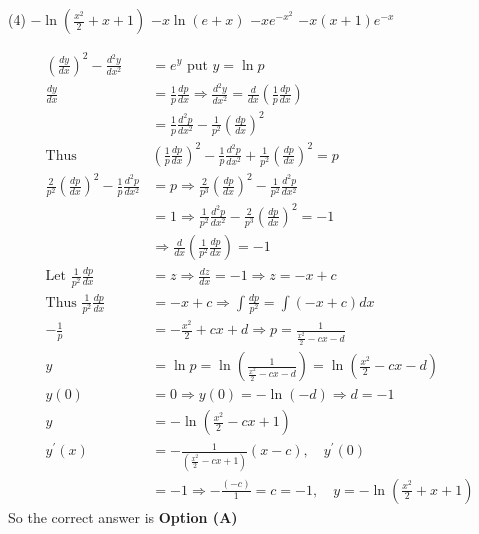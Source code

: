 \begin{enumerate}[label=\color{ocre}\textbf{\arabic*.}]
	{}
	\begin{tasks}(4)
		\task[\textbf{A.}] $-\ln \left(\frac{x^{2}}{2}+x+1\right)$
		\task[\textbf{B.}] $-x \ln (e+x)$
		\task[\textbf{C.}] $-x e^{-x^{2}}$
		\task[\textbf{D.}]  $-x(x+1) e^{-x}$
	\end{tasks}
	\begin{answer}
		\begin{align*}
		\left(\frac{d y}{d x}\right)^{2}-\frac{d^{2} y}{d x^{2}}&=e^{y}\text{ put }y=\ln p\\
		\frac{d y}{d x}&=\frac{1}{p} \frac{d p}{d x} \Rightarrow \frac{d^{2} y}{d x^{2}}=\frac{d}{d x}\left(\frac{1}{p} \frac{d p}{d x}\right)\\&=\frac{1}{p} \frac{d^{2} p}{d x^{2}}-\frac{1}{p^{2}}\left(\frac{d p}{d x}\right)^{2}\\
		\text{Thus }&\left(\frac{1}{p} \frac{d p}{d x}\right)^{2}-\frac{1}{p} \frac{d^{2} p}{d x^{2}}+\frac{1}{p^{2}}\left(\frac{d p}{d x}\right)^{2}=p\\
		\frac{2}{p^{2}}\left(\frac{d p}{d x}\right)^{2}-\frac{1}{p} \frac{d^{2} p}{d x^{2}}&=p \Rightarrow \frac{2}{p^{3}}\left(\frac{d p}{d x}\right)^{2}-\frac{1}{p^{2}} \frac{d^{2} p}{d x^{2}}\\&=1 \Rightarrow \frac{1}{p^{2}} \frac{d^{2} p}{d x^{2}}-\frac{2}{p^{3}}\left(\frac{d p}{d x}\right)^{2}=-1\\
		&\Rightarrow \frac{d}{d x}\left(\frac{1}{p^{2}} \frac{d p}{d x}\right)=-1\\
		\text{Let }\frac{1}{p^{2}} \frac{d p}{d x}&=z \Rightarrow \frac{d z}{d x}=-1 \Rightarrow z=-x+c\\
		\text{Thus }\frac{1}{p^{2}} \frac{d p}{d x}&=-x+c \Rightarrow \int \frac{d p}{p^{2}}=\int(-x+c) d x\\
		-\frac{1}{p}&=-\frac{x^{2}}{2}+c x+d \Rightarrow p=\frac{1}{\frac{x^{2}}{2}-c x-d}\\
		y&=\ln p=\ln \left(\frac{1}{\frac{x^{2}}{2}-c x-d}\right)=\ln \left(\frac{x^{2}}{2}-c x-d\right)\\
		y(0)&=0 \Rightarrow y(0)=-\ln (-d) \Rightarrow d=-1\\
		y&=-\ln \left(\frac{x^{2}}{2}-c x+1\right)\\
		y^{\prime}(x)&=-\frac{1}{\left(\frac{x^{2}}{2}-c x+1\right)}(x-c), \quad y^{\prime}(0)\\&=-1 \Rightarrow-\frac{(-c)}{1}=c=-1, \quad y=-\ln \left(\frac{x^{2}}{2}+x+1\right)
		\end{align*}
		So the correct answer is \textbf{Option (A)}
	\end{answer}
\end{enumerate}
